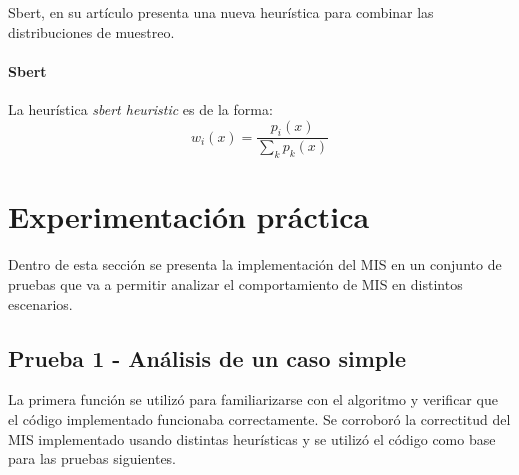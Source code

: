 \documentclass{article}
\begin{document}
Sbert, en su artículo \cite{Sbert2016} presenta una nueva heurística para combinar las distribuciones de muestreo.

\paragraph{Sbert} La heurística \textit{sbert heuristic} es de la forma:
$$ w_{i}(x) = \frac{p_{i}(x)}{\sum_{k} p_{k}(x)}$$




\section{Experimentación práctica}

Dentro de esta sección se presenta la implementación del MIS en un conjunto de pruebas que va a permitir analizar el comportamiento de MIS en distintos escenarios.

\subsection{Prueba 1 - Análisis de un caso simple}

La primera función se utilizó para familiarizarse con el algoritmo y verificar que el código implementado funcionaba correctamente.
Se corroboró la correctitud del MIS implementado usando distintas heurísticas y se utilizó el código como base para las pruebas siguientes.
\end{document}
